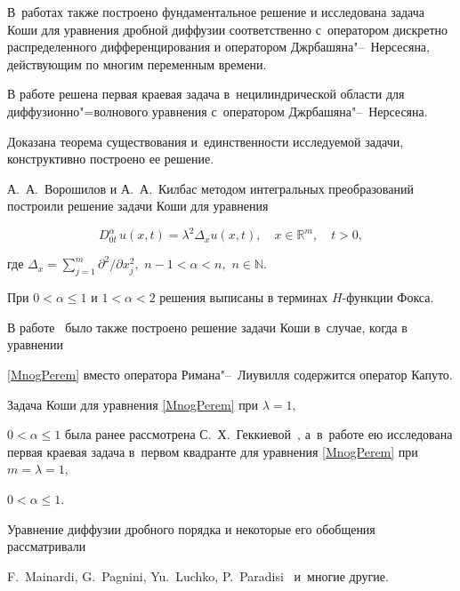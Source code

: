 В~работах  \cite{Pskhu-SibirJournal, Pskhu3} также построено фундаментальное решение и исследована задача Коши для уравнения дробной диффузии соответственно с~оператором дискретно распределенного дифференцирования и оператором Джрбашяна"--~Нерсесяна, действующим по многим переменным времени.

В работе \cite{Pskhu4} решена первая краевая задача в~нецилиндрической области для диффузионно"=волнового уравнения с~оператором Джрбашяна"--~Нерсесяна. 

Доказана теорема существования и~единственности исследуемой задачи, конструктивно построено ее решение. 



А.~А.~Ворошилов и А.~А.~Килбас \cite{VorKilbas} методом интегральных преобразований построили решение задачи Коши для уравнения

\begin{equation} \label{MnogPerem}

D^{\alpha}_{0t}\,u(x,t)=\lambda^2 \Delta_x u(x,t), \quad  x\in{\mathbb R}^m,\quad  t>0, 

\end{equation}

где $\Delta_x=\sum_{j=1}^{m}\partial^2/\partial x_{j}^{2},$ $n-1<\alpha <n,$ $n\in\mathbb{N}.$ 

При $0<\alpha\leqslant 1$ и $1<\alpha<2$ решения  выписаны в терминах $H$-функции Фокса.

В работе~\cite{VorKilbas2} было также  построено решение задачи Коши в~случае, когда в уравнении

\eqref{MnogPerem} вместо оператора Римана"--~Лиувилля содержится оператор Капуто. 



Задача Коши для уравнения \eqref{MnogPerem} при $\lambda=1,$ 

$0<\alpha\leqslant 1$  была ранее рассмотрена С.~Х.~Геккиевой~\cite{Gekk}, а~в~работе \cite{Gekkieva1} ею исследована первая краевая задача в~первом квадранте для уравнения \eqref{MnogPerem} при $m=\lambda=1,$ 

$0<\alpha\leqslant 1.$  







Уравнение диффузии дробного порядка и некоторые его обобщения рассматривали 

F.~Mainardi, G.~Pagnini, Yu.~Luchko, P.~Paradisi~\cite{Mainardi-1, Mainardi-3, Mainardi-2, Pagnini_1,   Pagnini_Paradisi}  и~многие другие. 

